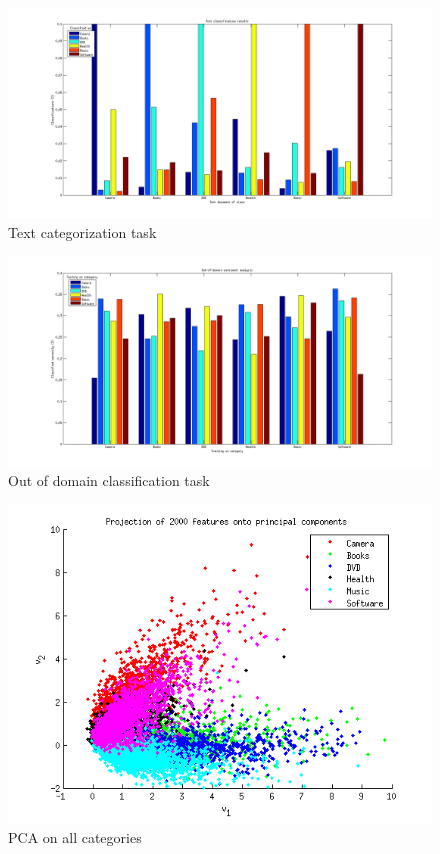 \begin{figure}
\centering
\includegraphics[scale = 0.47]{../Plottar/text_categorization.png}
\caption{Text categorization task}
\end{figure} 


\begin{figure}
\centering
\includegraphics[scale = 0.47]{../Plottar/outofdomain.png}
\caption{Out of domain classification task}
\end{figure} 

\begin{figure}[H]
\centering
\includegraphics[scale = 1]{../Plottar/pca_all.png}
\caption{PCA on all categories}
\end{figure} 

